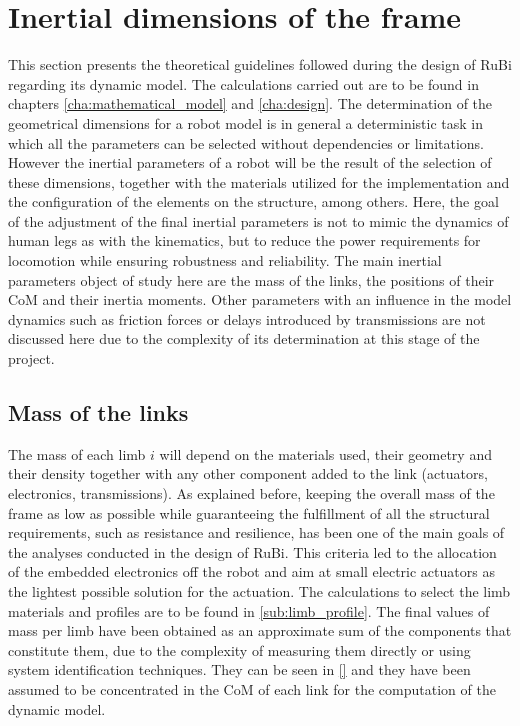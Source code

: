 
\section{Inertial dimensions of the frame} %
\label{sec:physical_properties}
This section presents the theoretical guidelines followed during the design of RuBi regarding its dynamic model.
The calculations carried out are to be found in chapters \ref{cha:mathematical_model} and \ref{cha:design}. 
The determination of the geometrical dimensions for a robot model is in general a deterministic task in which all the parameters can be selected without dependencies or limitations.
However the inertial parameters of a robot will be the result of the selection of these dimensions, together with the materials utilized for the implementation and the configuration of the elements on the structure, among others.
Here, the goal of the adjustment of the final inertial parameters is not to mimic the dynamics of human legs as with the kinematics, but to reduce the power requirements for locomotion while ensuring robustness and reliability.
The main inertial parameters object of study here are the mass of the links, the positions of their CoM and their inertia moments.
Other parameters with an influence in the model dynamics such as friction forces or delays introduced by transmissions are not discussed here due to the complexity of its determination at this stage of the project.

\subsection{Mass of the links} %
\label{sub:mass_of_the_limbs}
The mass of each limb $i$ will depend on the materials used, their geometry and their density together with any other component added to the link (actuators, electronics, transmissions).
As explained before, keeping the overall mass of the frame as low as possible while guaranteeing the fulfillment of all the structural requirements, such as resistance and resilience, has been one of the main goals of the analyses conducted in the design of RuBi.
This criteria led to the allocation of the embedded electronics off the robot and aim at small electric actuators as the lightest possible solution for the actuation. 
The calculations to select the limb materials and profiles are to be found in \ref{sub:limb_profile}.
The final values of mass per limb have been obtained as an approximate sum of the components that constitute them, due to the complexity of measuring them directly or using system identification techniques. 
They can be seen in \ref{} 
and they have been assumed to be concentrated in the CoM of each link for the computation of the dynamic model.


